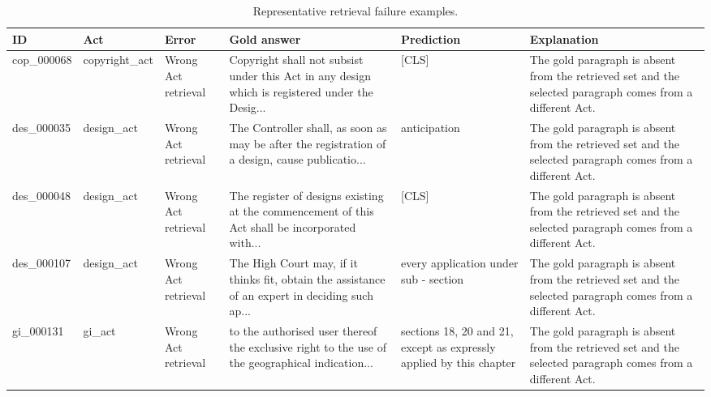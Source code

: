 \begin{table}[htbp]
\centering
\caption{Representative retrieval failure examples.}
\label{tab:retrieval_failure_examples}
\scriptsize
\begin{tabular}{llllll}
\toprule
ID & Act & Error & Gold answer & Prediction & Explanation \\
\midrule
cop\_000068 & copyright\_act & Wrong Act retrieval & Copyright shall not subsist under this Act in any design which is registered under the Desig... & [CLS] & The gold paragraph is absent from the retrieved set and the selected paragraph comes from a different Act. \\
des\_000035 & design\_act & Wrong Act retrieval & The Controller shall, as soon as may be after the registration of a design, cause publicatio... & anticipation & The gold paragraph is absent from the retrieved set and the selected paragraph comes from a different Act. \\
des\_000048 & design\_act & Wrong Act retrieval & The register of designs existing at the commencement of this Act shall be incorporated with... & [CLS] & The gold paragraph is absent from the retrieved set and the selected paragraph comes from a different Act. \\
des\_000107 & design\_act & Wrong Act retrieval & The High Court may, if it thinks fit, obtain the assistance of an expert in deciding such ap... & every application under sub - section & The gold paragraph is absent from the retrieved set and the selected paragraph comes from a different Act. \\
gi\_000131 & gi\_act & Wrong Act retrieval & to the authorised user thereof the exclusive right to the use of the geographical indication... & sections 18, 20 and 21, except as expressly applied by this chapter & The gold paragraph is absent from the retrieved set and the selected paragraph comes from a different Act. \\
\bottomrule
\end{tabular}
\end{table}
